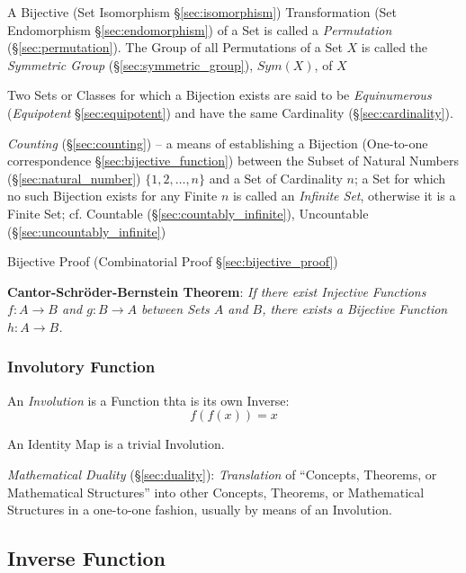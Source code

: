 A Bijective (Set Isomorphism \S\ref{sec:isomorphism}) Transformation (Set
Endomorphism \S\ref{sec:endomorphism}) of a Set is called a \emph{Permutation}
(\S\ref{sec:permutation}). The Group of all Permutations of a Set $X$ is called
the \emph{Symmetric Group} (\S\ref{sec:symmetric_group}), $Sym(X)$, of $X$

Two Sets or Classes for which a Bijection exists are said to be
\emph{Equinumerous} (\emph{Equipotent} \S\ref{sec:equipotent}) and have the same
Cardinality (\S\ref{sec:cardinality}).

\fist \emph{Counting} (\S\ref{sec:counting}) -- a means of establishing a
Bijection (One-to-one correspondence \S\ref{sec:bijective_function}) between the
Subset of Natural Numbers (\S\ref{sec:natural_number}) $\{1,2,\ldots,n\}$ and a
Set of Cardinality $n$; a Set for which no such Bijection exists for any Finite
$n$ is called an \emph{Infinite Set}, otherwise it is a Finite Set;
cf. Countable (\S\ref{sec:countably_infinite}), Uncountable
(\S\ref{sec:uncountably_infinite})

\fist Bijective Proof (Combinatorial Proof \S\ref{sec:bijective_proof})

\textbf{Cantor-Schr\"oder-Bernstein Theorem}: \emph{If there exist Injective
  Functions $f : A \to B$ and $g : B \to A$ between Sets $A$ and
  $B$, there exists a Bijective Function $h : A \to B$.}



\subsubsection{Involutory Function}\label{sec:involution}

An \emph{Involution} is a Function thta is its own Inverse:
\[
  f(f(x)) = x
\]

An Identity Map is a trivial Involution.

\fist \emph{Mathematical Duality} (\S\ref{sec:duality}): \emph{Translation} of
``Concepts, Theorems, or Mathematical Structures'' into other Concepts,
Theorems, or Mathematical Structures in a one-to-one fashion, usually by means
of an Involution.



\subsection{Inverse Function}\label{sec:inverse_function}

